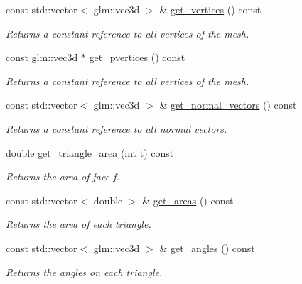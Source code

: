 \begin{DoxyCompactItemize}
const std\+::vector$<$ glm\+::vec3d $>$ \& \hyperlink{classgeoproc_1_1TriangleMesh_a0398e2ed3a068164cf4d8f7be6dcd75b}{get\+\_\+vertices} () const
\begin{DoxyCompactList}\small\item\em Returns a constant reference to all vertices of the mesh. \end{DoxyCompactList}\item 
\mbox{\label{classgeoproc_1_1TriangleMesh_a94cec74eea2ba1e1eb2d88bad03bff52}} 
const glm\+::vec3d $\ast$ \hyperlink{classgeoproc_1_1TriangleMesh_a94cec74eea2ba1e1eb2d88bad03bff52}{get\+\_\+pvertices} () const
\begin{DoxyCompactList}\small\item\em Returns a constant reference to all vertices of the mesh. \end{DoxyCompactList}\item 
const std\+::vector$<$ glm\+::vec3d $>$ \& \hyperlink{classgeoproc_1_1TriangleMesh_a99cd3ba891b1a14d23b3ed4ffe5cf264}{get\+\_\+normal\+\_\+vectors} () const
\begin{DoxyCompactList}\small\item\em Returns a constant reference to all normal vectors. \end{DoxyCompactList}\item 
double \hyperlink{classgeoproc_1_1TriangleMesh_af1a434795a750dad98c3ad55723472cc}{get\+\_\+triangle\+\_\+area} (int t) const
\begin{DoxyCompactList}\small\item\em Returns the area of face {\itshape f}. \end{DoxyCompactList}\item 
\mbox{\label{classgeoproc_1_1TriangleMesh_a3dc00d63c44e3c0b19878e230304e24f}} 
const std\+::vector$<$ double $>$ \& \hyperlink{classgeoproc_1_1TriangleMesh_a3dc00d63c44e3c0b19878e230304e24f}{get\+\_\+areas} () const
\begin{DoxyCompactList}\small\item\em Returns the area of each triangle. \end{DoxyCompactList}\item 
const std\+::vector$<$ glm\+::vec3d $>$ \& \hyperlink{classgeoproc_1_1TriangleMesh_aeb65492e33c37f47b12fe41a7e58c79d}{get\+\_\+angles} () const
\begin{DoxyCompactList}\small\item\em Returns the angles on each triangle. \end{DoxyCompactList}\item 

\end{DoxyCompactItemize}
